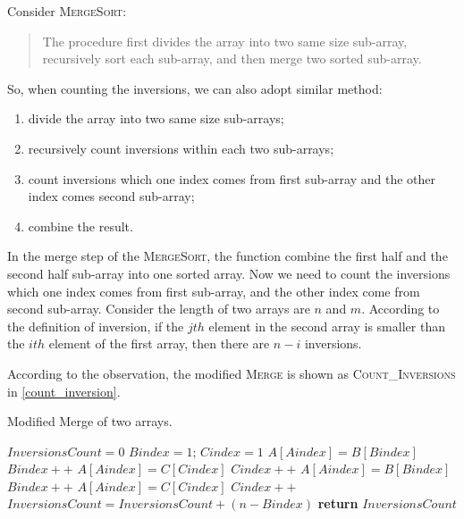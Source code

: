 \begin{homeworkProblem}[Inversions]

Consider \textsc{MergeSort}:

\begin{quote}
    The procedure first divides the array into two same size sub-array, recursively
    sort each sub-array, and then merge two sorted sub-array.
\end{quote}

So, when counting the inversions, we can also adopt similar method:
\begin{enumerate}
\item divide the array into two same size sub-arrays;
\item recursively count inversions within each two sub-arrays;
\item count inversions which one index comes from first sub-array and the other index comes
second sub-array;
\item combine the result.
\end{enumerate}

In the merge step of the \textsc{MergeSort}, the function combine the first half
and the second half sub-array into one sorted array. Now we need to count the
inversions which one index comes from first sub-array, and the other index come
from second sub-array. Consider the length of two arrays are $n$ and $m$.
According to the definition of inversion, if the $jth$ element in the second
array is smaller than the $ith$ element of the first array, then there are $n - i$
inversions.

According to the observation, the modified \textsc{Merge} is shown as \textsc{Count\_Inversions} in \cref{count_inversion}.

\begin{algorithm}[H]
    \caption{Modified Merge of two arrays.} \label{count_inversion}
    \begin{algorithmic}[1]
        \State$InversionsCount = 0$
        \State$Bindex = 1$; $Cindex = 1$
             
                \State $A[Aindex]= B[Bindex]$
                \State $Bindex++$
             
                \State $A[Aindex] = C[Cindex]$
                \State $Cindex++$
             
                \State $A[Aindex] = B[Bindex]$
                \State $Bindex++$
            \Else {}
                \State $A[Aindex] = C[Cindex]$
                \State $Cindex++$
                \State $InversionsCount = InversionsCount + (n - Bindex)$
            \EndIf
        \EndFor
        \State \textbf{return } $InversionsCount$
        \EndProcedure
    \end{algorithmic}
\end{algorithm}


\end{homeworkProblem}
